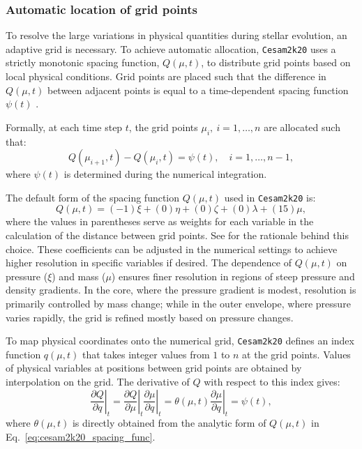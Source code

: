 \documentclass[12pt,a4paper]{article}
\newcommand{\pfird}[2][]{\frac{\partial#1}{\partial#2}}
\begin{document}
\subsubsection{Automatic location of grid points}
\label{sec:cesam2k20_grid}

To resolve the large variations in physical quantities during stellar evolution, an adaptive grid is necessary. To achieve automatic allocation, \texttt{Cesam2k20} uses a strictly monotonic spacing function, $Q(\mu, t)$, to distribute grid points based on local physical conditions. Grid points are placed such that the difference in $Q(\mu, t)$ between adjacent points is equal to a time-dependent spacing function $\psi(t)$ \parencite{Eggleton1971,PressEtAl1992,Morel1997}.

Formally, at each time step $t$, the grid points $\mu_i,\ i = 1,\ldots,n$ are allocated such that:
\begin{equation}
  Q(\mu_{i+1}, t) - Q(\mu_i, t) = \psi(t),\quad i = 1, \ldots, n-1,
\end{equation}
where $\psi(t)$ is determined during the numerical integration. 

The default form of the spacing function $Q(\mu, t)$ used in \texttt{Cesam2k20} is:
\begin{equation}
  Q(\mu, t) = (-1)\xi + (0)\eta + (0)\zeta + (0)\lambda + (15)\mu, \label{eq:cesam2k20_spacing_func}
\end{equation}
where the values in parentheses serve as weights for each variable in the calculation of the distance between grid points. See \textcite{Morel1997,Manchon2021} for the rationale behind this choice. These coefficients can be adjusted in the numerical settings to achieve higher resolution in specific variables if desired. The dependence of $Q(\mu, t)$ on pressure ($\xi$) and mass ($\mu$) ensures finer resolution in regions of steep pressure and density gradients. In the core, where the pressure gradient is modest, resolution is primarily controlled by mass change; while in the outer envelope, where pressure varies rapidly, the grid is refined mostly based on pressure changes.

To map physical coordinates onto the numerical grid, \texttt{Cesam2k20} defines an index function $q(\mu, t)$ that takes integer values from $1$ to $n$ at the grid points. Values of physical variables at positions between grid points are obtained by interpolation on the grid. The derivative of $Q$ with respect to this index gives:
\begin{equation}
  \left.\pfird[Q]{q}\right|_t = \left.\pfird[Q]{\mu}\right|_t\left.\pfird[\mu]{q}\right|_t = \theta(\mu, t)\left.\pfird[\mu]{q}\right|_t = \psi(t),
\end{equation}
where $\theta(\mu, t)$ is directly obtained from the analytic form of $Q(\mu, t)$ in Eq.~\eqref{eq:cesam2k20_spacing_func}.
\end{document}
